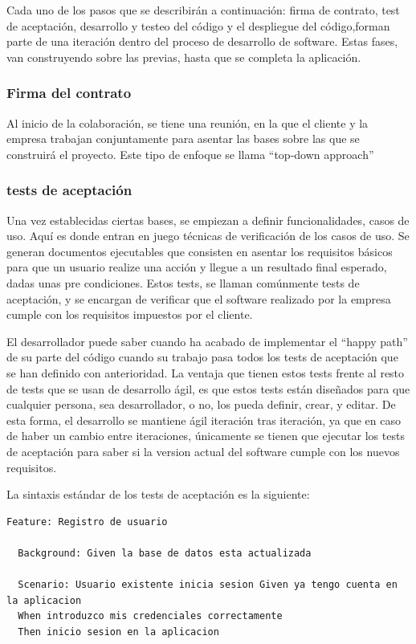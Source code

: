 \documentclass[12pt]{report} %
\begin{document}
Cada uno de los pasos que se describirán a continuación: firma de contrato, test
de aceptación, desarrollo y testeo del código y el despliegue del código,forman
parte de una iteración dentro del proceso de desarrollo de software.  Estas
fases, van construyendo sobre las previas, hasta que se completa la aplicación.

\subsubsection{Firma del contrato}

Al inicio de la colaboración, se tiene una reunión, en la que el cliente y la
empresa trabajan conjuntamente para asentar las bases sobre las que se
construirá el proyecto.  Este tipo de enfoque se llama ``top-down approach''

\subsubsection{tests de aceptación}

Una vez establecidas ciertas bases, se empiezan a definir funcionalidades, casos
de uso.  Aquí es donde entran en juego técnicas de verificación de los casos de
uso.  Se generan documentos ejecutables que consisten en asentar los requisitos
básicos para que un usuario realize una acción y llegue a un resultado final
esperado, dadas unas pre condiciones.  Estos tests, se llaman comúnmente tests
de aceptación, y se encargan de verificar que el software realizado por la
empresa cumple con los requisitos impuestos por el cliente.

El desarrollador puede saber cuando ha acabado de implementar el ``happy path''
de su parte del código cuando su trabajo pasa todos los tests de aceptación que
se han definido con anterioridad.  La ventaja que tienen estos tests frente al
resto de tests que se usan de desarrollo ágil, es que estos tests están
diseñados para que cualquier persona, sea desarrollador, o no, los pueda
definir, crear, y editar.  De esta forma, el desarrollo se mantiene ágil
iteración tras iteración, ya que en caso de haber un cambio entre iteraciones,
únicamente se tienen que ejecutar los tests de aceptación para saber si la
version actual del software cumple con los nuevos requisitos.

La sintaxis estándar de los tests de aceptación es la siguiente:

\begin{lstlisting} 
Feature: Registro de usuario

  Background: Given la base de datos esta actualizada

  Scenario: Usuario existente inicia sesion Given ya tengo cuenta en la aplicacion 
  When introduzco mis credenciales correctamente 
  Then inicio sesion en la aplicacion 
\end{lstlisting}
\end{document}
